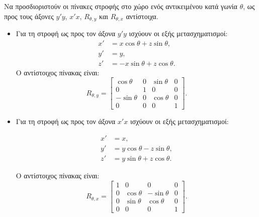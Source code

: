 \begin{exercise}

Να προσδιοριστούν οι πίνακες στροφής στο χώρο ενός αντικειμένου κατά γωνία $\theta$, ως προς τους άξονες $y'y$, $x'x$, $R_{\theta,y}$ και $R_{\theta,x}$ αντίστοιχα.	
\end{exercise}
\begin{solution}
	



\begin{itemize}
  \item  Για τη στροφή ως προς τον άξονα $y'y$ ισχύουν οι εξής μετασχηματισμοί:
\[
\begin{aligned}
    x' &= x\cos\theta + z\sin\theta, \\
    y' &= y, \\
    z' &= -x\sin\theta + z\cos\theta.
\end{aligned}
\]
Ο αντίστοιχος πίνακας είναι:
\[
R_{\theta,y} = \begin{bmatrix}
\cos\theta & 0 & \sin\theta & 0\\
0 & 1 & 0  & 0\\
-\sin\theta & 0 & \cos\theta & 0\\
0 & 0 & 0 & 1
\end{bmatrix}.
\]

\item Για τη στροφή ως προς τον άξονα $x'x$ ισχύουν οι εξής μετασχηματισμοί:

\[
\begin{aligned}
    x' &= x, \\
    y' &= y\cos\theta - z\sin\theta, \\
    z' &= y\sin\theta + z\cos\theta.
\end{aligned}
\]

Ο αντίστοιχος πίνακας είναι:
\[
R_{\theta,x} = \begin{bmatrix}
1 & 0 & 0 & 0\\
0 & \cos\theta & -\sin\theta & 0\\
0 & \sin\theta & \cos\theta & 0\\
0 & 0 & 0 & 1
\end{bmatrix}.
\]

\end{itemize}
\end{solution}